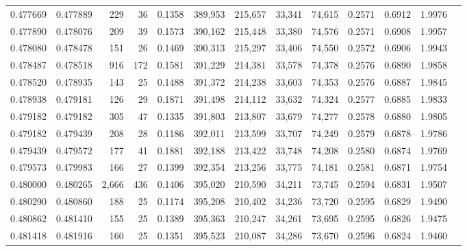 \begin{tabular}{rrrrrrrrrrrrr}
0.477669 & 0.477889 &   229 &  36 &                                     0.1358 & 389,953 & 215,657 &  33,341 &  74,615 & 0.2571 & 0.6912 & 1.9976 \\
0.477890 & 0.478076 &   209 &  39 &                                     0.1573 & 390,162 & 215,448 &  33,380 &  74,576 & 0.2571 & 0.6908 & 1.9957 \\
0.478080 & 0.478478 &   151 &  26 &                                     0.1469 & 390,313 & 215,297 &  33,406 &  74,550 & 0.2572 & 0.6906 & 1.9943 \\
0.478487 & 0.478518 &   916 & 172 &                                     0.1581 & 391,229 & 214,381 &  33,578 &  74,378 & 0.2576 & 0.6890 & 1.9858 \\
0.478520 & 0.478935 &   143 &  25 &                                     0.1488 & 391,372 & 214,238 &  33,603 &  74,353 & 0.2576 & 0.6887 & 1.9845 \\
0.478938 & 0.479181 &   126 &  29 &                                     0.1871 & 391,498 & 214,112 &  33,632 &  74,324 & 0.2577 & 0.6885 & 1.9833 \\
0.479182 & 0.479182 &   305 &  47 &                                     0.1335 & 391,803 & 213,807 &  33,679 &  74,277 & 0.2578 & 0.6880 & 1.9805 \\
0.479182 & 0.479439 &   208 &  28 &                                     0.1186 & 392,011 & 213,599 &  33,707 &  74,249 & 0.2579 & 0.6878 & 1.9786 \\
0.479439 & 0.479572 &   177 &  41 &                                     0.1881 & 392,188 & 213,422 &  33,748 &  74,208 & 0.2580 & 0.6874 & 1.9769 \\
0.479573 & 0.479983 &   166 &  27 &                                     0.1399 & 392,354 & 213,256 &  33,775 &  74,181 & 0.2581 & 0.6871 & 1.9754 \\
0.480000 & 0.480265 & 2,666 & 436 &                                     0.1406 & 395,020 & 210,590 &  34,211 &  73,745 & 0.2594 & 0.6831 & 1.9507 \\
0.480290 & 0.480860 &   188 &  25 &                                     0.1174 & 395,208 & 210,402 &  34,236 &  73,720 & 0.2595 & 0.6829 & 1.9490 \\
0.480862 & 0.481410 &   155 &  25 &                                     0.1389 & 395,363 & 210,247 &  34,261 &  73,695 & 0.2595 & 0.6826 & 1.9475 \\
0.481418 & 0.481916 &   160 &  25 &                                     0.1351 & 395,523 & 210,087 &  34,286 &  73,670 & 0.2596 & 0.6824 & 1.9460 \\

\end{tabular}
